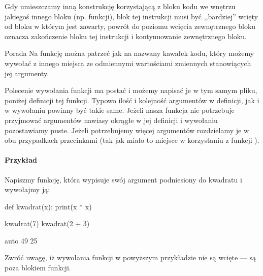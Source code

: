 Gdy umieszczamy inną konstrukcję korzystającą z bloku kodu we wnętrzu jakiegoś innego bloku (np. funkcji), blok tej instrukcji musi być ,,bardziej'' wcięty od bloku w którym jest zawarty,
powrót do poziomu wcięcia zewnętrznego bloku oznacza zakończenie bloku tej instrukcji i kontynuowanie zewnętrznego bloku.

\begin{ProTip}{Porada}
Na funkcję można patrzeć jak na nazwany kawałek kodu, który możemy wywołać z innego miejsca ze odmiennymi wartościami zmiennych stanowiących jej argumenty.
\end{ProTip}

Polecenie wywołania funkcji ma postać  i możemy napisać je w tym samym pliku, poniżej definicji tej funkcji.
Typowo ilość i kolejność argumentów w definicji, jak i w wywołaniu powinny być takie same.
Jeżeli nasza funkcja nie potrzebuje przyjmować argumentów nawiasy okrągłe w jej definicji i wywołaniu pozostawiamy puste.
Jeżeli potrzebujemy więcej argumentów rozdzielamy je w obu przypadkach przecinkami (tak jak miało to miejsce w korzystaniu z funkcji ).

\paragraph{Przykład}
Napiszmy funkcję, która wypisuje swój argument podniesiony do kwadratu i wywołajmy ją:

\begin{CodeFrame}[python]{.5\textwidth}
def kwadrat(x):
  print(x * x)

kwadrat(7)
kwadrat(2 + 3)
\end{CodeFrame}
\begin{CodeFrame}{auto}
49
25
\end{CodeFrame}

\noindent
Zwróć uwagę, iż wywołania funkcji w powyższym przykładzie nie są wcięte --- są poza blokiem funkcji.


